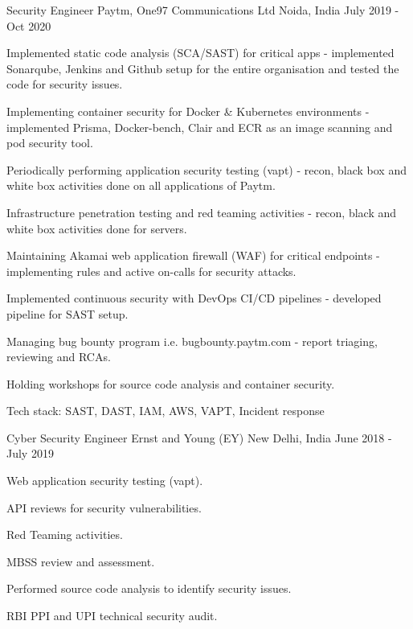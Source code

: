 \begin{cventries}
  \cventry
    {Security Engineer} %
    {Paytm, One97 Communications Ltd} %
    {Noida, India} %
    {July 2019 - Oct 2020} %
    {
      \begin{cvitems} %
        \item {Implemented static code analysis (SCA/SAST) for critical apps - implemented Sonarqube, Jenkins and Github setup for the entire organisation and tested the code for security issues.}
        \item {Implementing container security for Docker \& Kubernetes environments - implemented Prisma, Docker-bench, Clair and ECR as an image scanning and pod security tool.}
        \item {Periodically performing application security testing (vapt) - recon, black box and white box activities done on all applications of Paytm.}
        \item {Infrastructure penetration testing and red teaming activities - recon, black and white box activities done for servers.}
        \item {Maintaining Akamai web application firewall (WAF) for critical endpoints - implementing rules and active on-calls for security attacks.}
        \item {Implemented continuous security with DevOps CI/CD pipelines - developed pipeline for SAST setup.}
        \item {Managing bug bounty program i.e. bugbounty.paytm.com - report triaging, reviewing and RCAs.}
        \item {Holding workshops for source code analysis and container security.}
        \item {Tech stack: SAST, DAST, IAM, AWS, VAPT, Incident response}
      \end{cvitems}
    }

  \cventry
    {Cyber Security Engineer} %
    {Ernst and Young (EY)} %
    {New Delhi, India} %
    {June 2018 - July 2019} %
    {
      \begin{cvitems} %
        \item {Web application security testing (vapt).}
        \item {API reviews for security vulnerabilities.}
        \item {Red Teaming activities.}
        \item {MBSS review and assessment.}
        \item {Performed source code analysis to identify security issues.}
        \item {RBI PPI and UPI technical security audit.}
      \end{cvitems}
    }


\end{cventries}
